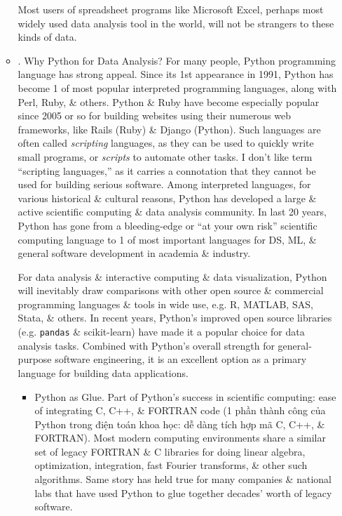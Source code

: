 \documentclass{article}
\begin{document}
\begin{itemize}
\begin{itemize}
		Most users of spreadsheet programs like Microsoft Excel, perhaps most widely used data analysis tool in the world, will not be strangers to these kinds of data.
		\item {. Why Python for Data Analysis?} For many people, Python programming language has strong appeal. Since its 1st appearance in 1991, Python has become 1 of most popular interpreted programming languages, along with Perl, Ruby, \& others. Python \& Ruby have become especially popular since 2005 or so for building websites using their numerous web frameworks, like Rails (Ruby) \& Django (Python). Such languages are often called {\it scripting} languages, as they can be used to quickly write small programs, or {\it scripts} to automate other tasks. I don't like term ``scripting languages,'' as it carries a connotation that they cannot be used for building serious software. Among interpreted languages, for various historical \& cultural reasons, Python has developed a large \& active scientific computing \& data analysis community. In last 20 years, Python has gone from a bleeding-edge or ``at your own risk'' scientific computing language to 1 of most important languages for DS, ML, \& general software development in academia \& industry.
		
		For data analysis \& interactive computing \& data visualization, Python will inevitably draw comparisons with other open source \& commercial programming languages \& tools in wide use, e.g. R, MATLAB, SAS, Stata, \& others. In recent years, Python's improved open source libraries (e.g. {\tt pandas} \& scikit-learn) have made it a popular choice for data analysis tasks. Combined with Python's overall strength for general-purpose software engineering, it is an excellent option as a primary language for building data applications.
		\begin{itemize}
			\item {\sf Python as Glue.} Part of Python's success in scientific computing: ease of integrating C, C++, \& FORTRAN code (1 phần thành công của Python trong điện toán khoa học: dễ dàng tích hợp mã C, C++, \& FORTRAN). Most modern computing environments share a similar set of legacy FORTRAN \& C libraries for doing linear algebra, optimization, integration, fast Fourier transforms, \& other such algorithms. Same story has held true for many companies \& national labs that have used Python to glue together decades' worth of legacy software.
			

\end{itemize}
\end{itemize}
\end{itemize}
\end{document}
